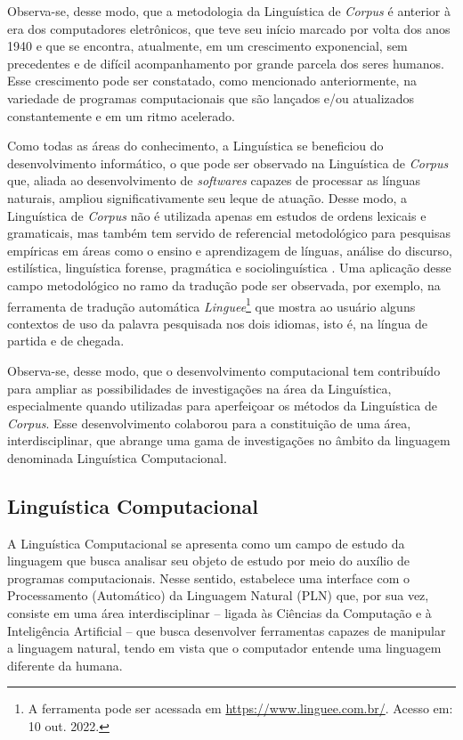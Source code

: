\documentclass[portuguese]{textolivre}
\begin{document}
Observa-se, desse modo, que a metodologia da Linguística de \textit{Corpus} é anterior à era dos computadores eletrônicos, que teve seu início marcado por volta dos anos 1940 e que se encontra, atualmente, em um crescimento exponencial, sem precedentes e de difícil acompanhamento por grande parcela dos seres humanos. Esse crescimento pode ser constatado, como mencionado anteriormente, na variedade de programas computacionais que são lançados e/ou atualizados constantemente e em um ritmo acelerado.

Como todas as áreas do conhecimento, a Linguística se beneficiou do desenvolvimento informático, o que pode ser observado na Linguística de \emph{Corpus} que, aliada ao desenvolvimento de \emph{softwares} capazes de processar as línguas naturais, ampliou significativamente seu leque de atuação. Desse modo, a Linguística de \emph{Corpus} não é utilizada apenas em estudos de ordens lexicais e gramaticais, mas também tem servido de referencial metodológico para pesquisas empíricas em áreas como o ensino e aprendizagem de línguas, análise do discurso, estilística, linguística forense, pragmática e sociolinguística \cite[p. 7]{okeefe2010routledge}. Uma aplicação desse campo metodológico no ramo da tradução pode ser observada, por exemplo, na ferramenta de tradução automática \emph{Linguee}\footnote{A ferramenta pode ser acessada em \url{https://www.linguee.com.br/}. Acesso em: 10 out. 2022.} que mostra ao usuário alguns contextos de uso da palavra pesquisada nos dois idiomas, isto é, na língua de partida e de chegada. 

Observa-se, desse modo, que o desenvolvimento computacional tem contribuído para ampliar as possibilidades de investigações na área da Linguística, especialmente quando utilizadas para aperfeiçoar os métodos da Linguística de \emph{Corpus}. Esse desenvolvimento colaborou para a constituição de uma área, interdisciplinar, que abrange uma gama de investigações no âmbito da linguagem denominada Linguística Computacional. 


\subsection{Linguística Computacional}
A Linguística Computacional se apresenta como um campo de estudo da linguagem que busca analisar seu objeto de estudo por meio do auxílio de programas computacionais. Nesse sentido, estabelece uma interface com o Processamento (Automático) da Linguagem Natural (PLN) que, por sua vez, consiste em uma área interdisciplinar – ligada às Ciências da Computação e à Inteligência Artificial – que busca desenvolver ferramentas capazes de manipular a linguagem natural, tendo em vista que o computador entende uma linguagem diferente da humana.
\end{document}
